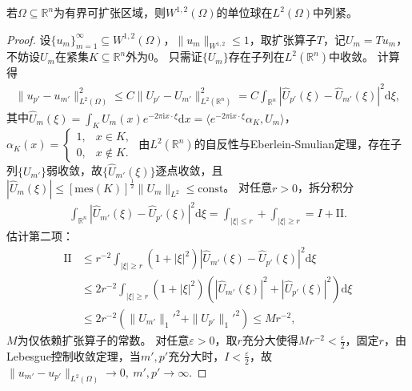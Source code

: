 \documentclass[../../main.tex]{subfiles}%
\begin{document}
\begin{theorem}[Rellich定理]\label{theorem:Rellich定理}
若$\Omega\subseteq\mathbb{R}^{n}$为有界可扩张区域，则$W^{1,2}(\Omega)$的单位球在$L^{2}(\Omega)$中列紧。
\end{theorem}
\begin{proof}
设$\{u_{m}\}_{m=1}^{\infty}\subseteq W^{1,2}(\Omega)$，$\|u_{m}\|_{W^{1,2}}\leqslant 1$，取扩张算子$T$，记$U_{m}=Tu_{m}$，不妨设$U_{m}$在紧集$K\subseteq\mathbb{R}^{n}$外为0。
只需证$\{U_{m}\}$存在子列在$L^{2}(\mathbb{R}^{n})$中收敛。
计算得
\begin{align*}
\|u_{p'}-u_{m'}\|_{L^{2}(\Omega)}^{2}\leqslant C\|U_{p'}-U_{m'}\|_{L^{2}(\mathbb{R}^{n})}^{2}=C\int_{\mathbb{R}^{n}}|\widehat{U}_{p'}(\xi)-\widehat{U}_{m'}(\xi)|^{2}\mathrm{d}\xi,
\end{align*}
其中$\widehat{U}_{m}(\xi)=\int_{K}U_{m}(x)e^{-2\pi \mathrm{i} x\cdot\xi}\mathrm{d}x=\langle e^{-2\pi \mathrm{i} x\cdot\xi}\alpha_{K},U_{m}\rangle$，$\alpha_{K}(x)=\begin{cases}1,&x\in K,\\0,&x\notin K.\end{cases}$
由$L^{2}(\mathbb{R}^{n})$的自反性与Eberlein‑Smulian定理，存在子列$\{U_{m'}\}$弱收敛，故$\{\widehat{U}_{m'}(\xi)\}$逐点收敛，且$|\widehat{U}_{m}(\xi)|\leqslant[\mathrm{mes}(K)]^{\frac{1}{2}}\|U_{m}\|_{L^{2}}\leqslant\mathrm{const}$。
对任意$r>0$，拆分积分
\begin{align*}
\int_{\mathbb{R}^{n}}|\widehat{U}_{m'}(\xi)-\widehat{U}_{p'}(\xi)|^{2}\mathrm{d}\xi=\int_{|\xi|\leqslant r}+\int_{|\xi|\geqslant r}=I+\mathrm{II}.
\end{align*}
估计第二项：
\begin{align*}
\mathrm{II}&\leqslant r^{-2}\int_{|\xi|\geqslant r}(1+|\xi|^{2})|\widehat{U}_{m'}(\xi)-\widehat{U}_{p'}(\xi)|^{2}\mathrm{d}\xi\\
&\leqslant 2r^{-2}\int_{|\xi|\geqslant r}(1+|\xi|^{2})\left(|\widehat{U}_{m'}(\xi)|^{2}+|\widehat{U}_{p'}(\xi)|^{2}\right)\mathrm{d}\xi\\
&\leqslant 2r^{-2}\left(\|U_{m'}\|_{1}'^{2}+\|U_{p'}\|_{1}'^{2}\right)\leqslant Mr^{-2},
\end{align*}
$M$为仅依赖扩张算子的常数。
对任意$\varepsilon>0$，取$r$充分大使得$Mr^{-2}<\frac{\varepsilon}{2}$，固定$r$，由Lebesgue控制收敛定理，当$m',p'$充分大时，$I<\frac{\varepsilon}{2}$，故$\|u_{m'}-u_{p'}\|_{L^{2}(\Omega)}\to 0,\ m',p'\to\infty$.
\end{proof}
\end{document}
